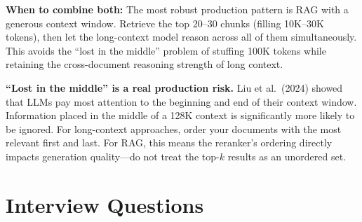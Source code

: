 \textbf{When to combine both:} The most robust production pattern is RAG with a generous context window. Retrieve the top 20--30 chunks (filling 10K--30K tokens), then let the long-context model reason across all of them simultaneously. This avoids the ``lost in the middle'' problem of stuffing 100K tokens while retaining the cross-document reasoning strength of long context.

\begin{warningbox}
\textbf{``Lost in the middle'' is a real production risk.} Liu et al.\ (2024) showed that LLMs pay most attention to the beginning and end of their context window. Information placed in the middle of a 128K context is significantly more likely to be ignored. For long-context approaches, order your documents with the most relevant first and last. For RAG, this means the reranker's ordering directly impacts generation quality---do not treat the top-$k$ results as an unordered set.
\end{warningbox}

\section{Interview Questions}
\label{sec:rag_interview}


